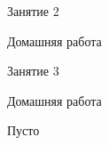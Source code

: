 \begin{class}[number=2]
	\begin{listofex}
		\item Занятие 2
	\end{listofex}
\end{class}

\begin{homework}[number=2]
	\begin{listofex}
		\item Домашняя работа
	\end{listofex}
\end{homework}

\begin{class}[number=3]
	\begin{listofex}
		\item Занятие 3
	\end{listofex}
\end{class}

\begin{homework}[number=3]
	\begin{listofex}
		\item Домашняя работа
	\end{listofex}
\end{homework}

\begin{class}[number=4]
	\begin{listofex}
		\item Пусто
	\end{listofex}
\end{class}
